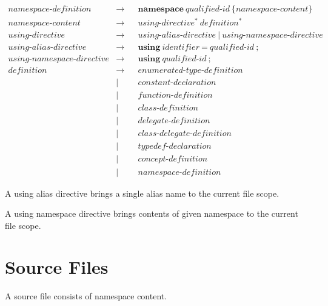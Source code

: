 \documentclass[a4paper,oneside,11pt]{article}
\begin{document}
\begin{align*}
namespace\textrm{-}definition &\rightarrow & &\textbf{namespace} \> \hyperref[qualifiedid]{qualified\textrm{-}id} \>
\texttt{\{} namespace\textrm{-}content \texttt{\}}\\
namespace\textrm{-}content &\rightarrow & &using\textrm{-}directive^* \> definition^*\\
using\textrm{-}directive &\rightarrow & &using\textrm{-}alias\textrm{-}directive \> | \> using\textrm{-}namespace\textrm{-}directive\\
using\textrm{-}alias\textrm{-}directive &\rightarrow & &\textbf{using} \> \hyperref[identifier]{identifier} \> \texttt{=} \>
\hyperref[qualifiedid]{qualified\textrm{-}id} \> \texttt{;}\\
using\textrm{-}namespace\textrm{-}directive &\rightarrow & &\textbf{using} \> \hyperref[qualifiedid]{qualified\textrm{-}id} \> \texttt{;}\\
definition &\rightarrow & &\hyperref[enumeratedtypedefinition]{enumerated\textrm{-}type\textrm{-}definition}\\
&| & &\hyperref[constantdeclaration]{constant\textrm{-}declaration}\\
&| & &\hyperref[functiondefinition]{function\textrm{-}definition}\\
&| & &\hyperref[classdefinition]{class\textrm{-}definition}\\
&| & &\hyperref[delegatedefinition]{delegate\textrm{-}definition}\\
&| & &\hyperref[classdelegatedefinition]{class\textrm{-}delegate\textrm{-}definition}\\
&| & &\hyperref[typedefdeclaration]{typedef\textrm{-}declaration}\\
&| & &\hyperref[conceptdefinition]{concept\textrm{-}definition}\\
&| & &namespace\textrm{-}definition
\end{align*}

A using alias directive brings a single alias name to the current file scope.

A using namespace directive brings contents of given namespace to the current file scope.

\section{Source Files}\label{sourcefile}

A source file consists of namespace content.
\end{document}
